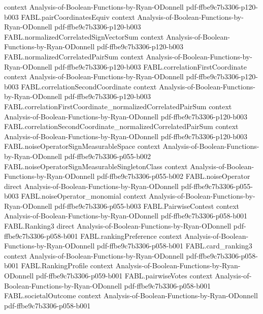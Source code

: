 \begin{theorem}
  {context}
  {Analysis-of-Boolean-Functions-by-Ryan-ODonnell}
  {pdf-ffbe9c7b3306-p120-b003}
\proofstep
  {FABL.pairCoordinatesEquiv}
  {context}
  {Analysis-of-Boolean-Functions-by-Ryan-ODonnell}
  {pdf-ffbe9c7b3306-p120-b003}
\proofstep
  {FABL.normalizedCorrelatedSignVectorSum}
  {context}
  {Analysis-of-Boolean-Functions-by-Ryan-ODonnell}
  {pdf-ffbe9c7b3306-p120-b003}
\proofstep
  {FABL.normalizedCorrelatedPairSum}
  {context}
  {Analysis-of-Boolean-Functions-by-Ryan-ODonnell}
  {pdf-ffbe9c7b3306-p120-b003}
\proofstep
  {FABL.correlationFirstCoordinate}
  {context}
  {Analysis-of-Boolean-Functions-by-Ryan-ODonnell}
  {pdf-ffbe9c7b3306-p120-b003}
\proofstep
  {FABL.correlationSecondCoordinate}
  {context}
  {Analysis-of-Boolean-Functions-by-Ryan-ODonnell}
  {pdf-ffbe9c7b3306-p120-b003}
\proofstep
  {FABL.correlationFirstCoordinate_normalizedCorrelatedPairSum}
  {context}
  {Analysis-of-Boolean-Functions-by-Ryan-ODonnell}
  {pdf-ffbe9c7b3306-p120-b003}
\proofstep
  {FABL.correlationSecondCoordinate_normalizedCorrelatedPairSum}
  {context}
  {Analysis-of-Boolean-Functions-by-Ryan-ODonnell}
  {pdf-ffbe9c7b3306-p120-b003}
\proofstep
  {FABL.noiseOperatorSignMeasurableSpace}
  {context}
  {Analysis-of-Boolean-Functions-by-Ryan-ODonnell}
  {pdf-ffbe9c7b3306-p055-b002}
\proofstep
  {FABL.noiseOperatorSignMeasurableSingletonClass}
  {context}
  {Analysis-of-Boolean-Functions-by-Ryan-ODonnell}
  {pdf-ffbe9c7b3306-p055-b002}
\proofstep
  {FABL.noiseOperator}
  {direct}
  {Analysis-of-Boolean-Functions-by-Ryan-ODonnell}
  {pdf-ffbe9c7b3306-p055-b003}
\proofstep
  {FABL.noiseOperator_monomial}
  {context}
  {Analysis-of-Boolean-Functions-by-Ryan-ODonnell}
  {pdf-ffbe9c7b3306-p055-b003}
\proofstep
  {FABL.PairwiseContest}
  {context}
  {Analysis-of-Boolean-Functions-by-Ryan-ODonnell}
  {pdf-ffbe9c7b3306-p058-b001}
\proofstep
  {FABL.Ranking3}
  {direct}
  {Analysis-of-Boolean-Functions-by-Ryan-ODonnell}
  {pdf-ffbe9c7b3306-p058-b001}
\proofstep
  {FABL.rankingPreference}
  {context}
  {Analysis-of-Boolean-Functions-by-Ryan-ODonnell}
  {pdf-ffbe9c7b3306-p058-b001}
\proofstep
  {FABL.card_ranking3}
  {context}
  {Analysis-of-Boolean-Functions-by-Ryan-ODonnell}
  {pdf-ffbe9c7b3306-p058-b001}
\proofstep
  {FABL.RankingProfile}
  {context}
  {Analysis-of-Boolean-Functions-by-Ryan-ODonnell}
  {pdf-ffbe9c7b3306-p059-b001}
\proofstep
  {FABL.pairwiseVotes}
  {context}
  {Analysis-of-Boolean-Functions-by-Ryan-ODonnell}
  {pdf-ffbe9c7b3306-p058-b001}
\proofstep
  {FABL.societalOutcome}
  {context}
  {Analysis-of-Boolean-Functions-by-Ryan-ODonnell}
  {pdf-ffbe9c7b3306-p058-b001}

\end{theorem}
